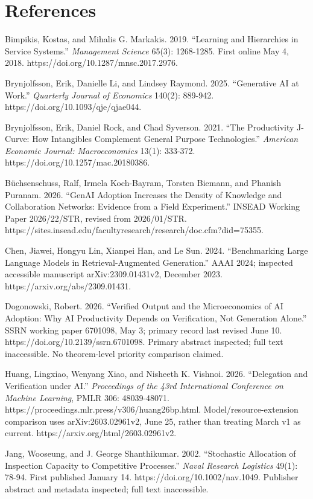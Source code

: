 \documentclass[
  11pt,
  a4paper,
]{article}
\begin{document}
\hypertarget{references}{%
\section{References}\label{references}}

Bimpikis, Kostas, and Mihalis G. Markakis. 2019. ``Learning and
Hierarchies in Service Systems.'' \emph{Management Science} 65(3):
1268-1285. First online May 4, 2018.
https://doi.org/10.1287/mnsc.2017.2976.

Brynjolfsson, Erik, Danielle Li, and Lindsey Raymond. 2025. ``Generative
AI at Work.'' \emph{Quarterly Journal of Economics} 140(2): 889-942.
https://doi.org/10.1093/qje/qjae044.

Brynjolfsson, Erik, Daniel Rock, and Chad Syverson. 2021. ``The
Productivity J-Curve: How Intangibles Complement General Purpose
Technologies.'' \emph{American Economic Journal: Macroeconomics} 13(1):
333-372. https://doi.org/10.1257/mac.20180386.

Büchsenschuss, Ralf, Irmela Koch-Bayram, Torsten Biemann, and Phanish
Puranam. 2026. ``GenAI Adoption Increases the Density of Knowledge and
Collaboration Networks: Evidence from a Field Experiment.'' INSEAD
Working Paper 2026/22/STR, revised from 2026/01/STR.
https://sites.insead.edu/facultyresearch/research/doc.cfm?did=75355.

Chen, Jiawei, Hongyu Lin, Xianpei Han, and Le Sun. 2024. ``Benchmarking
Large Language Models in Retrieval-Augmented Generation.'' AAAI 2024;
inspected accessible manuscript arXiv:2309.01431v2, December 2023.
https://arxiv.org/abs/2309.01431.

Dogonowski, Robert. 2026. ``Verified Output and the Microeconomics of AI
Adoption: Why AI Productivity Depends on Verification, Not Generation
Alone.'' SSRN working paper 6701098, May 3; primary record last revised
June 10. https://doi.org/10.2139/ssrn.6701098. Primary abstract
inspected; full text inaccessible. No theorem-level priority comparison
claimed.

Huang, Lingxiao, Wenyang Xiao, and Nisheeth K. Vishnoi. 2026.
``Delegation and Verification under AI.'' \emph{Proceedings of the 43rd
International Conference on Machine Learning}, PMLR 306: 48039-48071.
https://proceedings.mlr.press/v306/huang26bp.html.
Model/resource-extension comparison uses arXiv:2603.02961v2, June 25,
rather than treating March v1 as current.
https://arxiv.org/html/2603.02961v2.

Jang, Wooseung, and J. George Shanthikumar. 2002. ``Stochastic
Allocation of Inspection Capacity to Competitive Processes.''
\emph{Naval Research Logistics} 49(1): 78-94. First published January
14. https://doi.org/10.1002/nav.1049. Publisher abstract and metadata
inspected; full text inaccessible.
\end{document}
